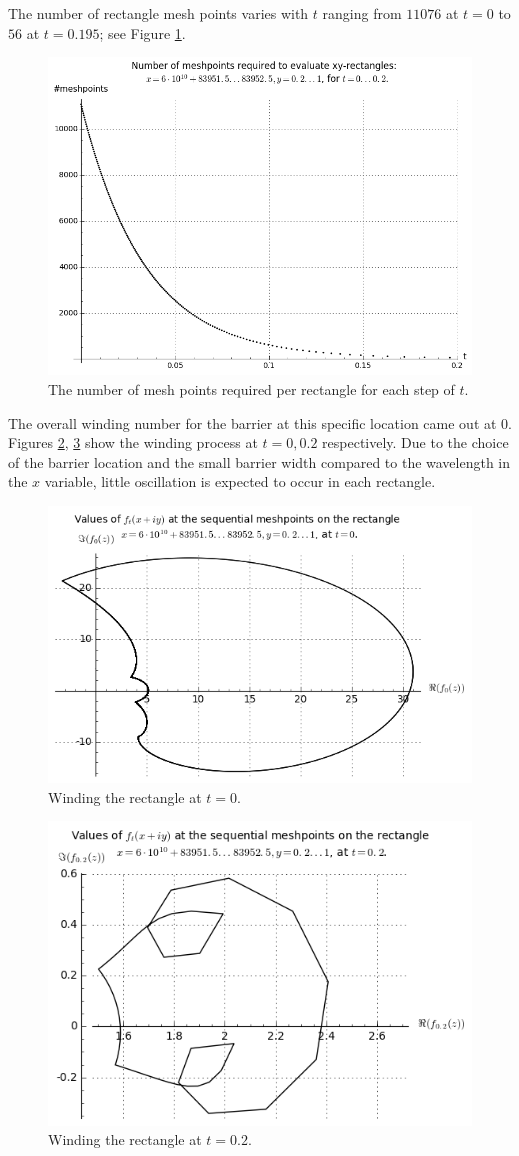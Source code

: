 \documentclass[a4paper,11pt,twoside]{amsart}
\begin{document}
The number of rectangle mesh points varies with $t$ ranging from $11076$ at $t=0$ to $56$ at $t=0.195$; see Figure \ref{fig3}.

\begin{figure}[ht!]
  \includegraphics[width=0.7\linewidth]{Numberofmeshpoints}
  \caption{The number of mesh points required per rectangle for each step of $t$.}\label{fig3}
\end{figure}

The overall winding number for the barrier at this specific location came out at $0$. Figures \ref{fig4}, \ref{fig4a} show the winding process at $t=0, 0.2$ respectively. Due to the choice of the barrier location and the small barrier width compared to the wavelength in the $x$ variable, little oscillation is expected to occur in each rectangle.

\begin{figure}[ht!]
  \includegraphics[width=0.7\linewidth]{Windingprocess}
  \caption{Winding the rectangle at $t=0$.}\label{fig4}
\end{figure}

\begin{figure}[ht!]
  \includegraphics[width=0.7\linewidth]{Windingprocess_t02}
  \caption{Winding the rectangle at $t=0.2$.}\label{fig4a}
\end{figure}
\end{document}
